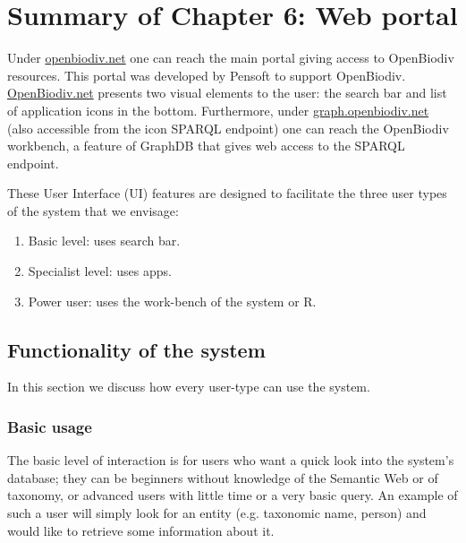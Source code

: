 
\chapter{Summary of Chapter 6: Web portal} %
\label{chapter-webportal}


Under \href{http://openbiodiv.net}{\url{openbiodiv.net}} one can reach the main portal giving access to OpenBiodiv resources. This portal was developed by Pensoft to support OpenBiodiv. \href{http://openbiodiv.net}{OpenBiodiv.net} presents two visual elements to the user: the search bar and list of application icons in the bottom. Furthermore, under \href{http://graph.openbiodiv.net}{\url{graph.openbiodiv.net}} (also accessible from the icon SPARQL endpoint) one can reach the OpenBiodiv workbench, a feature of GraphDB that gives web access to the SPARQL endpoint.

These User Interface (UI) features are designed to facilitate the three user types of the system that we envisage:

\begin{enumerate}
    \item Basic level: uses search bar.
    \item Specialist level: uses apps.
    \item Power user: uses the work-bench of the system or R.
\end{enumerate}

\section{Functionality of the system}

In this section we discuss how every user-type can use the system.

\subsection{Basic usage}

The basic level of interaction is for users who want a quick look into the system's database; they can be beginners without knowledge of the Semantic Web or of taxonomy, or advanced users with little time or a very basic query. An example of such a user will simply look for an entity (e.g. taxonomic name, person) and would like to retrieve some information about it. 

